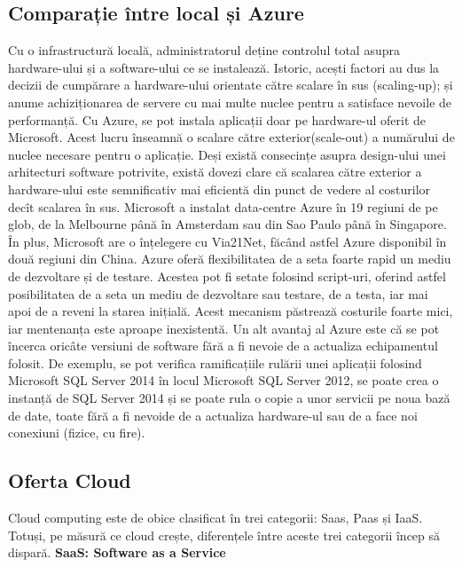 \subsection{Comparație între local și Azure}
Cu o infrastructură locală, administratorul deține controlul total asupra hardware-ului și a software-ului ce se instalează. Istoric, acești factori au dus la decizii de cumpărare a hardware-ului orientate către scalare în sus (scaling-up); și anume achiziționarea de servere cu mai multe nuclee pentru a satisface nevoile de performanță. Cu Azure, se pot instala aplicații doar pe hardware-ul oferit de Microsoft. Acest lucru înseamnă o scalare către exterior(scale-out) a numărului de nuclee necesare pentru o aplicație. Deși există consecințe asupra design-ului unei arhitecturi software potrivite, există dovezi clare că scalarea către exterior a hardware-ului este semnificativ mai eficientă din punct de vedere al costurilor decît scalarea în sus.\newline
Microsoft a instalat data-centre Azure în 19 regiuni de pe glob, de la Melbourne până în Amsterdam sau din Sao Paulo până în Singapore. În plus, Microsoft are o înțelegere cu Via21Net, făcând astfel Azure disponibil în două regiuni din China.\newline
Azure oferă flexibilitatea de a seta foarte rapid un mediu de dezvoltare și de testare. Acestea pot fi setate folosind script-uri, oferind astfel posibilitatea de a seta un mediu de dezvoltare sau testare, de a testa, iar mai apoi de a reveni la starea inițială. Acest mecanism păstrează costurile foarte mici, iar mentenanța este aproape inexistentă.\newline
Un alt avantaj al Azure este că se pot încerca oricâte versiuni de software fără a fi nevoie de a actualiza echipamentul folosit. De exemplu, se pot verifica ramificațiile rulării unei aplicații folosind Microsoft SQL Server 2014 în locul Microsoft SQL Server 2012, se poate crea o instanță de SQL Server 2014 și se poate rula o copie a unor servicii pe noua bază de date, toate fără a fi nevoide de a actualiza hardware-ul sau de a face noi conexiuni (fizice, cu fire).\newline

\subsection{Oferta Cloud}
Cloud computing este de obice clasificat în trei categorii: Saas, Paas și IaaS. Totuși, pe măsură ce cloud crește, diferențele între aceste trei categorii încep să dispară.
\textbf{SaaS: Software as a Service}

